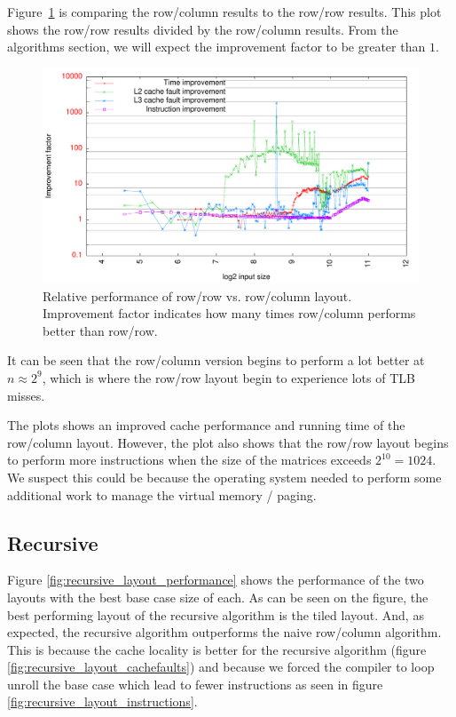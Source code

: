 Figure~\ref{fig:rowcol_vs_rowrow} is comparing the row/column results
to the row/row results. This plot shows the row/row results divided by
the row/column results. From the algorithms section, we will expect
the improvement factor to be greater than $1$.
\begin{figure}[h!]
  \centering
  \includegraphics[width=\textwidth]{plots/rowcol_vs_rowrow}
  \caption{Relative performance of row/row vs. row/column
    layout. Improvement factor indicates how many times row/column
    performs better than row/row.}
  \label{fig:rowcol_vs_rowrow}
\end{figure}

It can be seen that the row/column version begins to perform a lot
better at $n \approx 2^9$, which is where the row/row layout begin to
experience lots of TLB misses.

The plots shows an improved cache performance and running time of the
row/column layout. However, the plot also shows that the row/row
layout begins to perform more instructions when the size of the
matrices exceeds $2^{10} = 1024$. We suspect this could be because the
operating system needed to perform some additional work to manage the
virtual memory / paging.

\subsection{Recursive}

Figure \ref{fig:recursive_layout_performance} shows the performance of the two layouts with the best base case size of each. As can be seen on the figure, the best performing layout of the recursive algorithm is the tiled layout. And, as expected, the recursive algorithm outperforms the naive row/column algorithm. This is because the cache locality is better for the recursive algorithm (figure \ref{fig:recursive_layout_cachefaults}) and because we forced the compiler to loop unroll the base case which lead to fewer instructions as seen in figure \ref{fig:recursive_layout_instructions}.

